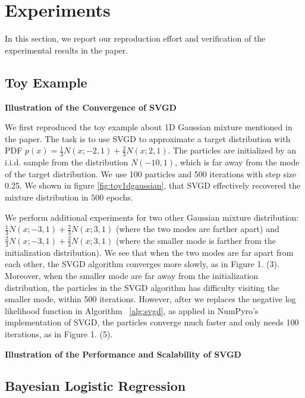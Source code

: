 \section{Experiments}
In this section, we report our reproduction effort and verification of the experimental results in the paper.

\subsection{Toy Example}


\textbf{Illustration of the Convergence of SVGD}

We first reproduced the toy example about 1D Gaussian mixture mentioned in the paper. The task is to use SVGD to approximate a target distribution with PDF $p(x) = \frac{1}{3} N(x; -2, 1) + \frac{2}{3} N(x; 2, 1)$. The particles are initialized by an i.i.d. sample from the distribution $N(-10, 1)$, which is far away from the mode of the target distribution. We use 100 particles and 500 iterations with step size 0.25. We shown in figure \ref{fig:toy1dgaussian}, that SVGD effectively recovered the mixture distribution in $500$ epochs.

We perform additional experiments for two other Gaussian mixture distribution: $\frac{1}{3} N(x; -3, 1) + \frac{2}{3} N(x; 3, 1)$ (where the two modes are farther apart) and $\frac{2}{3} N(x; -3, 1) + \frac{2}{3} N(x; 3, 1)$ (where the smaller mode is farther from the initialization distribution). We see that when the two modes are far apart from each other, the SVGD algorithm converges more slowly, as in Figure 1. (3). Moreover, when the smaller mode are far away from the initialization distribution, the particles in the SVGD algorithm has difficulty visiting the smaller mode, within 500 iterations. However, after we replaces the negative log likelihood function in Algorithm ~\ref{alg:svgd}, as applied in NumPyro's implementation of SVGD, the particles converge much faster and only needs 100 iterations, as in Figure 1. (5). 

\textbf{Illustration of the Performance and Scalability of SVGD}





\subsection{Bayesian Logistic Regression}
